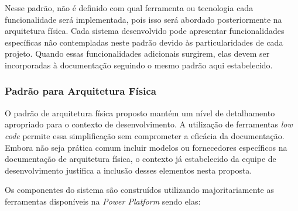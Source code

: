 	Nesse padrão, não é definido com qual ferramenta ou tecnologia cada funcionalidade será implementada, pois isso será abordado posteriormente na arquitetura física. Cada sistema desenvolvido pode apresentar funcionalidades específicas não contempladas neste padrão devido às particularidades de cada projeto. Quando essas funcionalidades adicionais surgirem, elas devem ser incorporadas à documentação seguindo o mesmo padrão aqui estabelecido.

	\subsubsection{Padrão para Arquitetura Física}

	O padrão de arquitetura física proposto mantém um nível de detalhamento apropriado 
	para o contexto de desenvolvimento. A utilização de ferramentas \textit{low code} 
	permite essa simplificação sem comprometer a eficácia da documentação. Embora não 
	seja prática comum incluir modelos ou fornecedores específicos na documentação de 
	arquitetura física, o contexto já estabelecido da equipe de desenvolvimento 
	justifica a inclusão desses elementos nesta proposta.

	Os componentes do sistema são construídos utilizando majoritariamente as ferramentas disponíveis na \textit{Power Platform} sendo elas:

